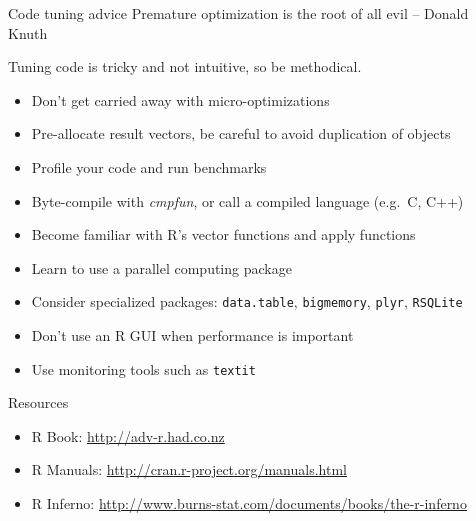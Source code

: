 \documentclass[ignorenonframetext,]{beamer}
\providecommand{\tightlist}{%
  \setlength{\itemsep}{0pt}\setlength{\parskip}{0pt}}
\begin{document}
\begin{frame}[fragile]{Code tuning advice \textbar{} Premature
optimization is the root of all evil -- Donald Knuth}

Tuning code is tricky and not intuitive, so be methodical.

\begin{itemize}
\tightlist
\item
  Don't get carried away with micro-optimizations
\item
  Pre-allocate result vectors, be careful to avoid duplication of
  objects
\item
  Profile your code and run benchmarks
\item
  Byte-compile with \textit{cmpfun}, or call a compiled language
  (e.g.~C, C++)
\item
  Become familiar with R's vector functions and apply functions
\item
  Learn to use a parallel computing package
\item
  Consider specialized packages: \texttt{data.table},
  \texttt{bigmemory}, \texttt{plyr}, \texttt{RSQLite}
\item
  Don't use an R GUI when performance is important
\item
  Use monitoring tools such as \texttt{textit}
\end{itemize}

\end{frame}

\begin{frame}{Resources}

\begin{itemize}
\tightlist
\item
  R Book: \url{http://adv-r.had.co.nz}
\item
  R Manuals: \url{http://cran.r-project.org/manuals.html}
\item
  R Inferno:
  \href{\%5Bhttp://www.burns-stat.com/documents/books/the-r-inferno\%5D}{http://www.burns-stat.com/documents/books/the-r-inferno}
\end{itemize}

\end{frame}
\end{document}

